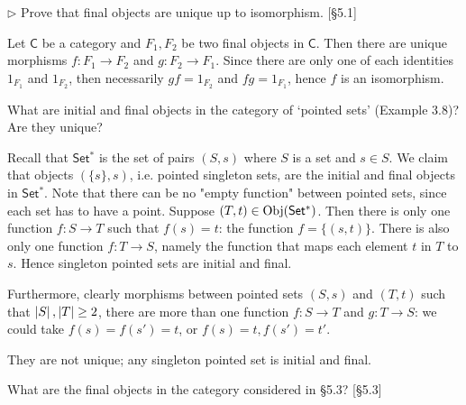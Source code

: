 \begin{problem}[5.3]
	$\rhd$ Prove that final objects are unique up to isomorphism. [\S 5.1]
\end{problem}
\begin{solution}
	\def \C {\mathsf{C}}
	Let $\C$ be a category and $F_1,F_2$ be two final objects in $\C$. Then there
	are unique morphisms $f:F_1\to F_2$ and $g:F_2\to F_1$. Since there are only one
	of each identities $1_{F_1}$ and $1_{F_2}$, then necessarily $gf = 1_{F_2}$ and
	$fg = 1_{F_1}$, hence $f$ is an isomorphism.
\end{solution}


\begin{problem}[5.4]
	What are initial and final objects in the category of `pointed sets' (Example
	3.8)? Are they unique?
\end{problem}
\begin{solution}
	Recall that $\mathsf{{Set^*}}$ is the set of pairs $(S,s)$ where $S$ is a set and $s\in S$.
	We claim that objects $(\{s\},s)$, i.e. pointed singleton sets, are the initial
	and final objects in $\mathsf{{Set^*}}$. Note that there can be no "empty function" between
	pointed sets, since each set has to have a point. Suppose $(T,t)\in\mathrm{Obj}(\mathsf{{Set^*}})$.
	Then there is only one function $f:S\to T$ such that $f(s)=t$: the function
	$f=\{(s,t)\}$. There is also only one function $f:T\to S$, namely the function
	that maps each element $t$ in $T$ to $s$. Hence singleton pointed sets are
	initial and final.
	
	Furthermore, clearly morphisms between pointed sets $(S,s)$ and $(T,t)$ such
	that $\left|S\right|,\left|T\right|\geq 2$, there are more than one function $f:S\to T$ and
	$g:T\to S$: we could take $f(s)=f(s')=t$, or $f(s)=t,f(s')=t'$.
	
	They are not unique; any singleton pointed set is initial and final.
\end{solution}

\begin{problem}[5.5]
	What are the final objects in the category considered in \S5.3? [\S5.3]
\end{problem}
\begin{solution}
\end{solution}

